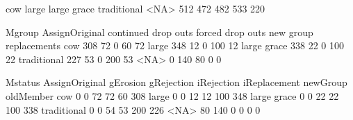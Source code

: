 \begin{Schunk}
\begin{Soutput}

        cow       large large grace traditional        <NA> 
        512         472         482         533         220 
\end{Soutput}
\begin{Soutput}
              Mgroup
AssignOriginal continued drop outs forced drop outs new group replacements
   cow               308        72                0        60           72
   large             348        12                0       100           12
   large grace       338        22                0       100           22
   traditional       227        53                0       200           53
   <NA>                0       140               80         0            0
\end{Soutput}
\begin{Soutput}
              Mstatus
AssignOriginal gErosion gRejection iRejection iReplacement newGroup oldMember
   cow                0          0         72           72       60       308
   large              0          0         12           12      100       348
   large grace        0          0         22           22      100       338
   traditional        0          0         54           53      200       226
   <NA>              80        140          0            0        0         0
\end{Soutput}
\end{Schunk}

